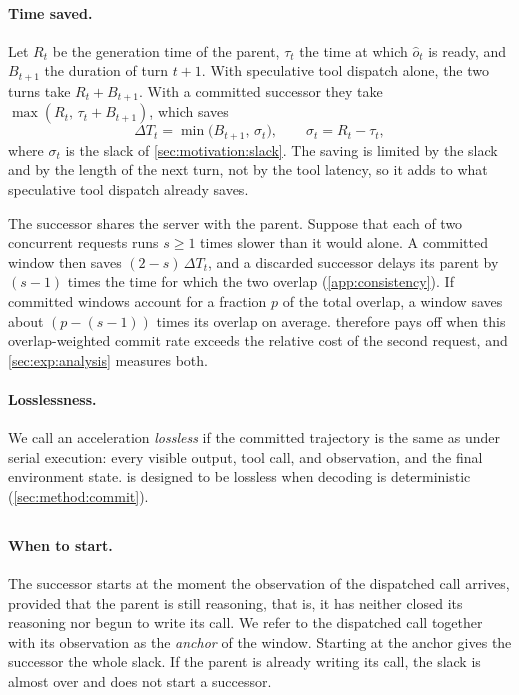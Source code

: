 \paragraph{Time saved.}
Let $R_t$ be the generation time of the parent, $\tau_t$ the time at which $\hat o_t$ is ready, and $B_{t+1}$ the duration of turn $t{+}1$.
With speculative tool dispatch alone, the two turns take $R_t+B_{t+1}$.
With a committed successor they take $\max(R_t,\,\tau_t+B_{t+1})$, which saves
\begin{equation}
  \Delta T_t=\min\big(B_{t+1},\,\sigma_t\big),
  \qquad \sigma_t=R_t-\tau_t,
  \label{eq:saving}
\end{equation}
where $\sigma_t$ is the slack of \cref{sec:motivation:slack}.
The saving is limited by the slack and by the length of the next turn, not by the tool latency, so it adds to what speculative tool dispatch already saves.

The successor shares the server with the parent.
Suppose that each of two concurrent requests runs $s\ge 1$ times slower than it would alone.
A committed window then saves $(2-s)\,\Delta T_t$, and a discarded successor delays its parent by $(s-1)$ times the time for which the two overlap (\cref{app:consistency}).
If committed windows account for a fraction $p$ of the total overlap, a window saves about $(p-(s-1))$ times its overlap on average.
\method therefore pays off when this overlap-weighted commit rate exceeds the relative cost of the second request, and \cref{sec:exp:analysis} measures both.

\paragraph{Losslessness.}
We call an acceleration \emph{lossless} if the committed trajectory is the same as under serial execution: every visible output, tool call, and observation, and the final environment state.
\method is designed to be lossless when decoding is deterministic (\cref{sec:method:commit}).

\subsection{\stratLaunch}
\label{sec:method:launch}

\paragraph{When to start.}
The successor starts at the moment the observation of the dispatched call arrives, provided that the parent is still reasoning, that is, it has neither closed its reasoning nor begun to write its call.
We refer to the dispatched call together with its observation as the \emph{anchor} of the window.
Starting at the anchor gives the successor the whole slack.
If the parent is already writing its call, the slack is almost over and \method does not start a successor.

